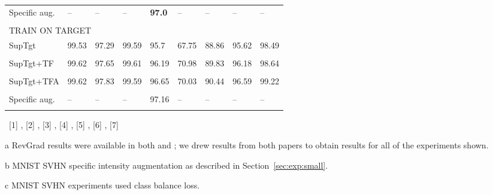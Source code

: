 \documentclass{article}
\begin{document}
\begin{table}[!t]
\begin{center}
\begin{threeparttable}
\begin{tabular}{lllllllll}
Specific aug.\tnote{b} &
           -- &           -- &   -- & \textbf{97.0}\tnote{c} &         -- &          -- &                -- &                -- \\
 &
              &              &               &     &            &             &                   &                   \\

\hline
\multicolumn{9}{l}{TRAIN ON TARGET} \\
\rule{0pt}{2.5ex}SupTgt\tnote{*}   &
        99.53 &        97.29 &         99.59 &         95.7 &       67.75 &       88.86 &             95.62 &             98.49 \\
&   &     &     &    &   &   &          &         \\

SupTgt+TF       &
        99.62 &        97.65 &         99.61 &        96.19 &       70.98 &       89.83 &             96.18 &             98.64 \\
&   &    &     &     &   &   &         &         \\

SupTgt+TFA       &
        99.62 &        97.83 &         99.59 &        96.65 &       70.03 &       90.44 &             96.59 &             99.22 \\
&   &    &     &    &   &   &         &         \\

Specific aug.\tnote{b} &
           -- &           -- &            -- &        97.16 &          -- &          -- &                -- &                -- \\
&             &              &               &    &             &             &                   &                   \\

\hline
\hline
\end{tabular}

\begin{tablenotes}
   \item~[1] \cite{Ganin:DomainAdaptBackprop}, [2] \cite{Ghifary:DomainAdaptRecons}, [3] \cite{Sankaranarayanan:GANAdapt},
   [4] \cite{Tzeng:AdvDiscDomAdapt}, [5] \cite{Saito:AsymTriDomAdapt}, [6] \cite{Russo:SBADAGAN}, [7] \cite{Haeusser:ADA}
   \item[a] RevGrad results were available in both \cite{Ganin:DomainAdaptBackprop} and \cite{Ghifary:DomainAdaptRecons}; we drew results from both papers to obtain results for all of the experiments shown.
   \item[b] MNIST  SVHN specific intensity augmentation as described in Section~\ref{sec:exp:small}.
   \item[c] MNIST  SVHN experiments used class balance loss.
\end{tablenotes}


\end{threeparttable}
\end{center}
\end{table}
\end{document}
